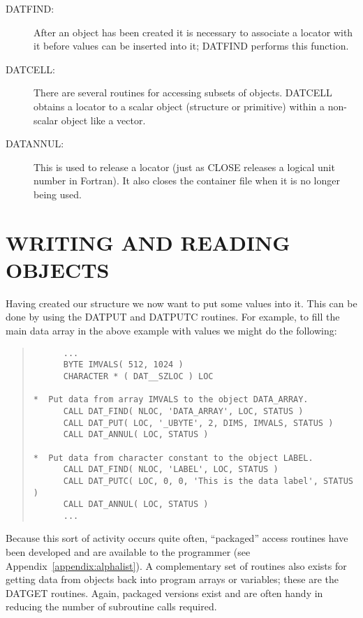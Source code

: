 \documentclass[twoside,11pt]{article}
\newcommand{\htmlref}[2]{#1}
\newcommand{\xlabel}[1]{}
\renewcommand{\_}{\texttt{\symbol{95}}}
\newcommand{\qt}[1]{``#1''}
\newcommand{\qt}[1]{{\tt{"}}#1{\tt{"}}}
\begin{document}
\begin{description}
\item [\htmlref{DAT\_FIND}{DAT_FIND}:]
After an object has been created it is necessary to associate a
locator with it before values can be inserted into it; DAT\_FIND
performs this function.

\item [\htmlref{DAT\_CELL}{DAT_CELL}:]
There are several routines for accessing subsets of objects. DAT\_CELL
obtains a locator to a scalar object (structure or primitive) within a
non-scalar object like a vector.

\item [\htmlref{DAT\_ANNUL}{DAT_ANNUL}:]
This is used to release a locator (just as CLOSE releases a logical
unit number in Fortran). It also closes the container file when it is
no longer being used.

\end{description}

\section{\xlabel{writing_and_reading}WRITING AND READING OBJECTS}

Having created our structure we now want to put some values into
it. This can be done by using the \htmlref{DAT\_PUT}{DAT_PUT} and
\htmlref{DAT\_PUTC}{DAT_PUTC} routines. For example, to fill the main
data array in the \htmlref{above example}{sect:creating} with
values we might do the following:

\small
\begin{quote}
\begin{verbatim}
      ...
      BYTE IMVALS( 512, 1024 )
      CHARACTER * ( DAT__SZLOC ) LOC

*  Put data from array IMVALS to the object DATA_ARRAY.
      CALL DAT_FIND( NLOC, 'DATA_ARRAY', LOC, STATUS )
      CALL DAT_PUT( LOC, '_UBYTE', 2, DIMS, IMVALS, STATUS )
      CALL DAT_ANNUL( LOC, STATUS )

*  Put data from character constant to the object LABEL.
      CALL DAT_FIND( NLOC, 'LABEL', LOC, STATUS )
      CALL DAT_PUTC( LOC, 0, 0, 'This is the data label', STATUS )
      CALL DAT_ANNUL( LOC, STATUS )
      ...
\end{verbatim}
\end{quote}
\normalsize

Because this sort of activity occurs quite often, \qt{packaged} access
routines have been developed and are available to the programmer (see
Appendix~\ref{appendix:alphalist}).  A complementary set of routines
also exists for getting data from objects back into program arrays or
variables; these are the DAT\_GET routines. Again, packaged versions
exist and are often handy in reducing the number of subroutine calls
required.
\end{document}
